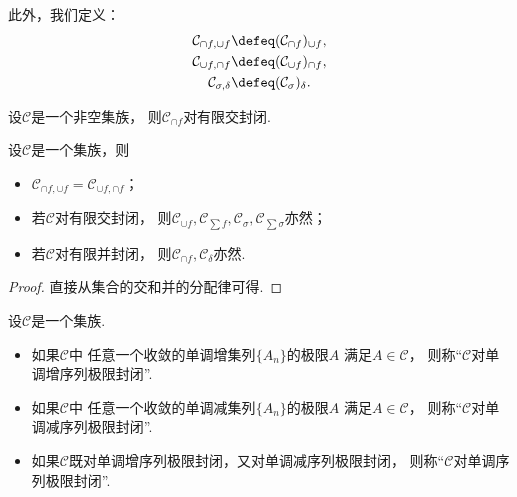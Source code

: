 此外，我们定义：\begin{gather*}
	\mathcal{C}_{\cap f,\cup f}
	\defeq
	(\mathcal{C}_{\cap f})_{\cup f}, \\
	\mathcal{C}_{\cup f,\cap f}
	\defeq
	(\mathcal{C}_{\cup f})_{\cap f}, \\
	\mathcal{C}_{\sigma,\delta}
	\defeq
	(\mathcal{C}_\sigma)_\delta.
\end{gather*}

\begin{proposition}
设\(\mathcal{C}\)是一个非空集族，
则\(\mathcal{C}_{\cap f}\)对有限交封闭.
\end{proposition}

\begin{proposition}
设\(\mathcal{C}\)是一个集族，则\begin{itemize}
	\item \(\mathcal{C}_{\cap f,\cup f} = \mathcal{C}_{\cup f,\cap f}\)；
	\item 若\(\mathcal{C}\)对有限交封闭，
	则\(\mathcal{C}_{\cup f},
	\mathcal{C}_{\sum f},
	\mathcal{C}_\sigma,
	\mathcal{C}_{\sum \sigma}\)亦然；
	\item 若\(\mathcal{C}\)对有限并封闭，
	则\(\mathcal{C}_{\cap f},
	\mathcal{C}_\delta\)亦然.
\end{itemize}
\begin{proof}
直接从集合的交和并的分配律可得.
\end{proof}
\end{proposition}

\begin{definition}
设\(\mathcal{C}\)是一个集族.
\begin{itemize}
	\item 如果\(\mathcal{C}\)中
	任意一个收敛的单调增集列\(\{A_n\}\)的极限\(A\)
	满足\(A\in\mathcal{C}\)，
	则称“\(\mathcal{C}\)对单调增序列极限封闭”.
	\item 如果\(\mathcal{C}\)中
	任意一个收敛的单调减集列\(\{A_n\}\)的极限\(A\)
	满足\(A\in\mathcal{C}\)，
	则称“\(\mathcal{C}\)对单调减序列极限封闭”.
	\item 如果\(\mathcal{C}\)既对单调增序列极限封闭，又对单调减序列极限封闭，
	则称“\(\mathcal{C}\)对单调序列极限封闭”.
\end{itemize}
\end{definition}


